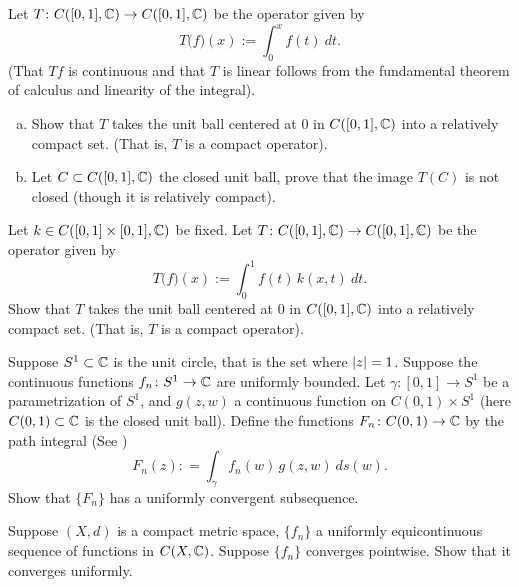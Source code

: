 \begin{exercise}
Let $T \colon C([0,1],{\mathbb{C}}) \to C([0,1],{\mathbb{C}})$ be the operator
given by
\begin{equation*}
T\bigl(f\bigr) (x) := \int_0^x f(t)~dt .
\end{equation*}
(That $Tf$ is continuous and that $T$ is linear follows from
the fundamental theorem of calculus and linearity of the integral).
\begin{enumerate}[a)]
\item
Show that $T$ takes the unit ball centered at 0 in $C([0,1],{\mathbb{C}})$ into a
relatively compact set.  (That is, $T$ is a compact operator).
\item
Let $C \subset C([0,1],{\mathbb{C}})$ the closed unit ball,
prove that
the image $T(C)$ is not closed (though it is relatively compact).
\end{enumerate}
\end{exercise}

\begin{exercise}
Let $k \in C([0,1]\times [0,1],{\mathbb{C}})$ be fixed.
Let $T \colon C([0,1],{\mathbb{C}}) \to C([0,1],{\mathbb{C}})$ be the operator
given by
\begin{equation*}
T\bigl(f\bigr)(x) :=  \int_0^1 f(t) \, k(x,t)~dt .
\end{equation*}
Show that $T$ takes the unit ball centered at 0 in $C([0,1],{\mathbb{C}})$ into a
relatively compact set.  (That is, $T$ is a compact operator).
\end{exercise}

\begin{exercise}
Suppose $S^1 \subset {\mathbb{C}}$ is the unit circle, that is the set where
$\lvert {z} \rvert=1$.  Suppose the continuous functions
$f_n \colon S^1 \to {\mathbb{C}}$ are uniformly bounded.
Let $\gamma \colon [0,1] \to S^1$ be a parametrization of $S^1$,
and $g(z,w)$ a continuous function on $C(0,1) \times S^1$
(here $C(0,1) \subset {\mathbb{C}}$ is the closed unit ball).  Define
the functions $F_n \colon C(0,1) \to {\mathbb{C}}$ by
the path integral (See )
\begin{equation*}
F_n(z) : = \int_\gamma f_n(w)\, g(z,w) ~ ds(w) . 
\end{equation*}
Show that $\{ F_n \}$ has a uniformly convergent subsequence.
\end{exercise}

\begin{exercise}
Suppose $(X,d)$ is a compact metric space, $\{ f_n \}$ a uniformly equicontinuous
sequence of functions in $C(X,{\mathbb{C}})$.  Suppose $\{ f_n \}$ converges
pointwise.  Show that it converges uniformly.
\end{exercise}

